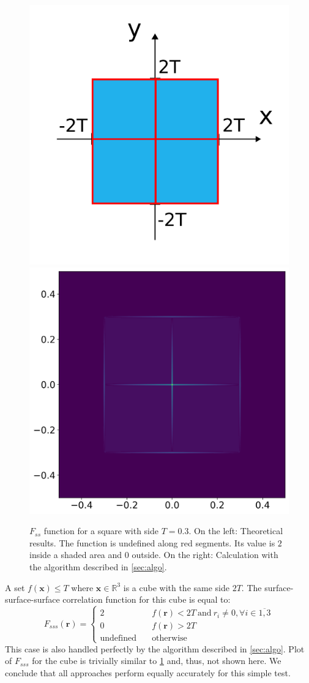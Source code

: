 \documentclass[preprint]{elsarticle}
\begin{document}
\begin{figure}
  \centering
  \includegraphics[width=0.45\linewidth]{images/fss-square.png}
  \hfill
  \includegraphics[width=0.45\linewidth]{images/fss-square-julia.png}
  \caption[]{$F_{ss}$ function for a square with side $T = 0.3$. On the left:
    Theoretical results. The function is undefined along red segments. Its value
    is $2$ inside a shaded area and $0$ outside. On the right: Calculation with
    the algorithm described in \cref{sec:algo}.}
  \label{fig:fss-square}
\end{figure}

A set $f(\bm{x}) \le T$ where $\bm{x} \in \mathbb{R}^3$ is a cube with the same
side $2T$.
The surface-surface-surface correlation function for this cube is equal to:
\begin{equation}
  F_{sss}(\bm{r}) = \left\{
  \begin{array}{ll}
    2 & \quad f(\bm{r}) < 2T \ \text{and}\ r_i \ne 0, \forall i \in \overline{1,3} \\
    0 & \quad f(\bm{r}) > 2T \\
    \text{undefined} & \quad \text{otherwise}
  \end{array}
  \right.
\end{equation}
This case is also handled perfectly by the algorithm described in
\cref{sec:algo}. Plot of $F_{sss}$ for the cube is trivially similar to
\cref{fig:fss-square} and, thus, not shown here. We conclude that all approaches
perform equally accurately for this simple test.
\end{document}
